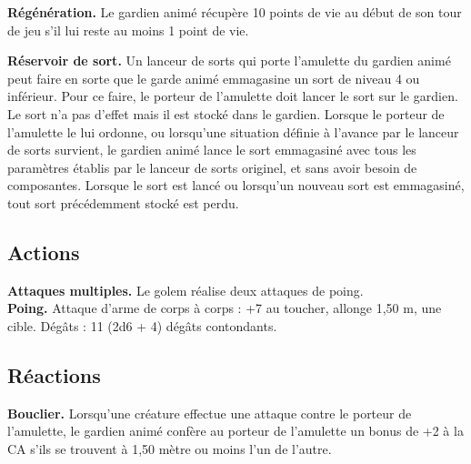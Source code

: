 \begin{figure*}[hbp]
{\begin{minipage}[c]{.45\linewidth}
    {\bfseries Régénération.} Le gardien animé récupère 10 points de vie au début de son tour de jeu s'il 
               lui reste au moins 1 point de vie.
  \end{minipage}
  \hspace{4pt}
  \begin{minipage}[c]{.45\linewidth}
    {\bfseries Réservoir de sort.} Un lanceur de sorts qui porte l'amulette du gardien animé peut faire en 
               sorte que le garde animé emmagasine un sort de niveau 4 ou inférieur. Pour ce faire, le 
               porteur de l'amulette doit lancer le sort sur le gardien. Le sort n'a pas d'effet mais il 
               est stocké dans le gardien. Lorsque le porteur de l'amulette le lui ordonne, ou lorsqu'une 
               situation définie à l'avance par le lanceur de sorts survient, le gardien animé lance le 
               sort emmagasiné avec tous les paramètres établis par le lanceur de sorts originel, et sans 
               avoir besoin de composantes. Lorsque le sort est lancé ou lorsqu'un nouveau sort est 
               emmagasiné, tout sort précédemment stocké est perdu.
    \subsection*{Actions}
    {\bfseries Attaques multiples.} Le golem réalise deux attaques de poing.\\
    {\bfseries Poing.} Attaque d'arme de corps à corps : +7 au toucher, allonge 1,50 m, une cible. 
               Dégâts : 11 (2d6 + 4) dégâts contondants.
    \subsection*{Réactions}
    {\bfseries Bouclier.} Lorsqu'une créature effectue une attaque contre le porteur de l'amulette, le 
               gardien animé confère au porteur de l'amulette un bonus de +2 à la CA s'ils se trouvent à 
               1,50 mètre ou moins l'un de l'autre.
  \end{minipage}
}%
\end{figure*}

